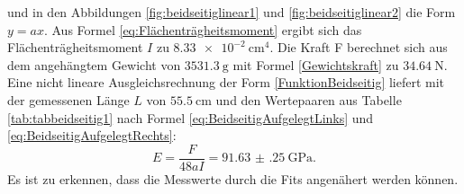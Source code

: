 und in den Abbildungen \ref{fig:beidseitiglinear1} und \ref{fig:beidseitiglinear2} die Form $y=a x$. Aus Formel \eqref{eq:Flächenträgheitsmoment} ergibt sich das Flächenträgheitsmoment $I$ zu $\SI{8.33e-2}{\centi\meter\tothe{4}}$.  Die Kraft F berechnet sich aus dem angehängtem Gewicht von $\SI{3531.3}{\gram}$ mit Formel \eqref{Gewichtskraft} zu $\SI{34.64}{\newton}$. Eine nicht lineare Ausgleichsrechnung der Form \eqref{FunktionBeidseitig} liefert mit der gemessenen Länge $L$ von $\SI{55.5}{\centi\meter}$ und den Wertepaaren aus Tabelle \ref{tab:tabbeidseitig1} nach Formel \eqref{eq:BeidseitigAufgelegtLinks} und \eqref{eq:BeidseitigAufgelegtRechts}:
\begin{displaymath}
E = \frac{F}{48 a I}= \SI{91.63(25)}{\giga\pascal}\text{.}
\end{displaymath}
Es ist zu erkennen, dass die Messwerte durch die Fits angenähert werden können.


